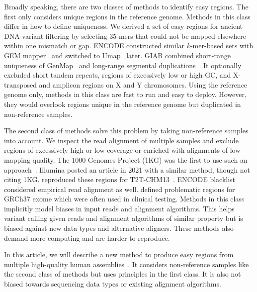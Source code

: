 \documentclass[webpdf,contemporary,large,namedate]{oup-authoring-template}%
\begin{document}
Broadly speaking, there are two classes of methods to identify easy regions.
The first only considers unique regions in the reference genome.
Methods in this class differ in how to define uniqueness.
We derived a set of easy regions for ancient DNA variant filtering by selecting 35-mers that could not be mapped elsewhere within one mismatch or gap.
ENCODE constructed similar $k$-mer-based sets with GEM mapper~\citep{Marco-Sola:2012kx}
and switched to Umap~\citep{Karimzadeh:2018aa} later.
GIAB combined short-range uniqueness of GenMap~\citep{Pockrandt:2020aa}
and long-range segmental duplications~\citep{Dwarshuis:2024aa}.
It optionally excluded short tandem repeats, regions of excessively low or high GC, and X-transposed and amplicon regions on X and Y chromosomes.
Using the reference genome only, methods in this class are fast to run and easy to deploy.
However, they would overlook regions unique in the reference genome but duplicated in non-reference samples.

The second class of methods solve this problem by taking non-reference samples into account.
We inspect the read alignment of multiple samples and exclude regions of excessively high or low coverage or enriched with alignments of low mapping quality.
The 1000 Genomes Project (1KG) was the first to use such an approach~\citep{1000-Genomes-Project-Consortium:2010qc}.
Illumina posted an article in 2021 with a similar method, though not citing 1KG.
\citet{Aganezov:2022aa} reproduced these regions for T2T-CHM13~\citep{Nurk:2022up}.
ENCODE blacklist~\citep{Amemiya:2019aa} considered empirical read alignment as well.
\citet{Mandelker:2016aa} defined problematic regions for GRCh37 exome which were often used in clinical testing.
Methods in this class implicitly model biases in input reads and alignment algorithms.
This helps variant calling given reads and alignment algorithms of similar property
but is biased against new data types and alternative aligners.
These methods also demand more computing and are harder to reproduce.

In this article, we will describe a new method to produce easy regions from multiple high-quality human assemblies~\citep{Liao:2023aa}.
It considers non-reference samples like the second class of methods but uses principles in the first class.
It is also not biased towards sequencing data types or existing alignment algorithms.
\end{document}
